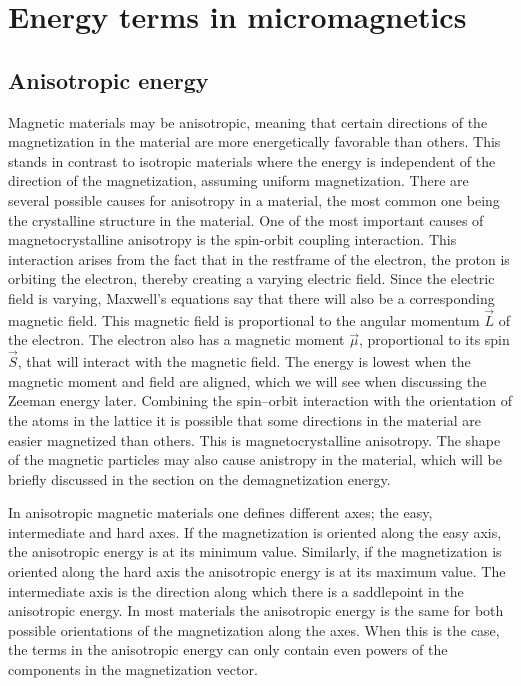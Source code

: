 \documentclass[12pt, a4paper, twoside, openright]{article}		%
\let\oldsection\section
\def\section{\cleardoublepage\oldsection}
\numberwithin{equation}{section}
\begin{document}
\section{Energy terms in micromagnetics}\label{sec:MicromagneticEnergy}
\subsection{Anisotropic energy}
Magnetic materials may be anisotropic, meaning that certain directions of the magnetization in the material are more energetically favorable than others. This stands in contrast to isotropic materials where the energy is independent of the direction of the magnetization, assuming uniform magnetization. There are several possible causes for anisotropy in a material, the most common one being the crystalline structure in the material. One of the most important causes of magnetocrystalline anisotropy is the spin-orbit coupling interaction. This interaction arises from the fact that in the restframe of the electron, the proton is orbiting the electron, thereby creating a varying electric field. Since the electric field is varying, Maxwell's equations say that there will also be a corresponding magnetic field. This magnetic field is proportional to the angular momentum $\vec{L}$ of the electron. The electron also has a magnetic moment $\vec{\mu}$, proportional to its spin $\vec{S}$, that will interact with the magnetic field. The energy is lowest when the magnetic moment and field are aligned, which we will see when discussing the Zeeman energy later. Combining the spin--orbit interaction with the orientation of the atoms in the lattice it is possible that some directions in the material are easier magnetized than others. This is magnetocrystalline anisotropy. The shape of the magnetic particles may also cause anistropy in the material, which will be briefly discussed in the section on the demagnetization energy. 

In anisotropic magnetic materials one defines different axes; the easy, intermediate and hard axes. If the magnetization is oriented along the easy axis, the anisotropic energy is at its minimum value. Similarly, if the magnetization is oriented along the hard axis the anisotropic energy is at its maximum value. The intermediate axis is the direction along which there is a saddlepoint in the anisotropic energy. In most materials the anisotropic energy is the same for both possible orientations of the magnetization along the axes. When this is the case, the terms in the anisotropic energy can only contain even powers of the components in the magnetization vector.
\end{document}
